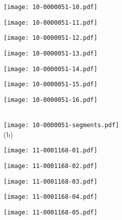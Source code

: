 \documentclass[10pt,twocolumn,letterpaper]{article}
\begin{document}
\begin{figure*}[t]
 \begin{minipage}{0.058\textwidth} \centering \texttt{[image: 10-0000051-10.pdf]} \end{minipage}
 \begin{minipage}{0.058\textwidth} \centering \texttt{[image: 10-0000051-11.pdf]} \end{minipage}
 \begin{minipage}{0.058\textwidth} \centering \texttt{[image: 10-0000051-12.pdf]} \end{minipage}
 \begin{minipage}{0.058\textwidth} \centering \texttt{[image: 10-0000051-13.pdf]} \end{minipage}
 \begin{minipage}{0.058\textwidth} \centering \texttt{[image: 10-0000051-14.pdf]} \end{minipage}
 \begin{minipage}{0.058\textwidth} \centering \texttt{[image: 10-0000051-15.pdf]} \end{minipage}
 \begin{minipage}{0.058\textwidth} \centering \texttt{[image: 10-0000051-16.pdf]} \end{minipage}
 \\ \vspace{2mm}
 \texttt{[image: 10-0000051-segments.pdf]}
 \\
 (b)
 \\ \vspace{2mm}
 \begin{minipage}{0.058\textwidth} \centering \texttt{[image: 11-0001168-01.pdf]} \end{minipage}
 \begin{minipage}{0.058\textwidth} \centering \texttt{[image: 11-0001168-02.pdf]} \end{minipage}
 \begin{minipage}{0.058\textwidth} \centering \texttt{[image: 11-0001168-03.pdf]} \end{minipage}
 \begin{minipage}{0.058\textwidth} \centering \texttt{[image: 11-0001168-04.pdf]} \end{minipage}
 \begin{minipage}{0.058\textwidth} \centering \texttt{[image: 11-0001168-05.pdf]} \end{minipage}

\end{figure*}
\end{document}
